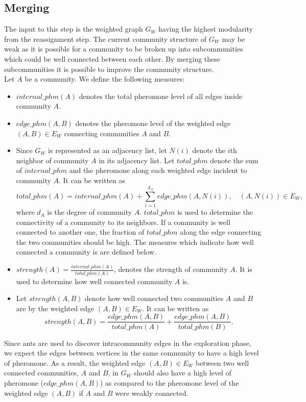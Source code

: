 \begin{spacing}{1.5}
\subsection{Merging}
The input to this step is the weighted graph $G_W$ having the highest modularity from the reassignment step. The current community structure of $G_W$ may be weak as it is possible for a community to be broken up into subcommunities which could be well connected between each other. By merging these subcommunities it is possible to improve the community structure.\\
\indent Let $A$ be a community. We define the following measures:
\begin{itemize}
	\item $internal\_phm(A)$ denotes the total pheromone level of all edges inside community $A$.
	\item $edge\_phm(A, B)$ denotes the pheromone level of the weighted edge $(A, B) \in E_W$ connecting communities $A$ and $B$.
	\item Since $G_W$ is represented as an adjacency list, let $N(i)$ denote the $i$th neighbor of community $A$ in its adjacency list. Let $total\_phm$ denote the sum of $internal\_phm$ and the pheromone along each weighted edge incident to community $A$. It can be written as
\begin{equation}
total\_phm(A) = internal\_phm(A) + \displaystyle\sum_{i = 1}^{d_A}edge\_phm(A, N(i)),\quad(A,N(i))\in E_W,
\end{equation}
where $d_A$ is the degree of community $A$. $total\_phm$ is used to determine the connectivity of a community to its neighbors. If a community is well connected to another one, the fraction of $total\_phm$ along the edge connecting the two communities should be high. The measures which indicate how well connected a community is are defined below.
\item $strength(A) = \frac{internal\_phm(A)}{total\_phm(A)}$, denotes the strength of community $A$. It is used to determine how well connected community $A$ is.
\item Let $strength(A,B)$ denote how well connected two communities $A$ and $B$ are by the weighted edge $(A,B)\in E_W$. It can be written as
\begin{equation}
strength(A, B)=\frac{edge\_phm(A,B)}{total\_phm(A)}+\frac{edge\_phm(A, B)}{total\_phm(B)}.
\end{equation}
\end{itemize}
\indent  Since ants are used to discover intracommunity edges in the exploration phase, we expect the edges between vertices in the same community to have a high level of pheromone.  As a result, the weighted edge $(A, B)\in E_W$ between two well connected communities, $A$ and $B$, in $G_W$ should also have a high level of pheromone ($edge\_phm(A,B)$) as compared to the pheromone level of the weighted edge $(A,B)$ if $A$ and $B$ were weakly connected.\\

\end{spacing}
